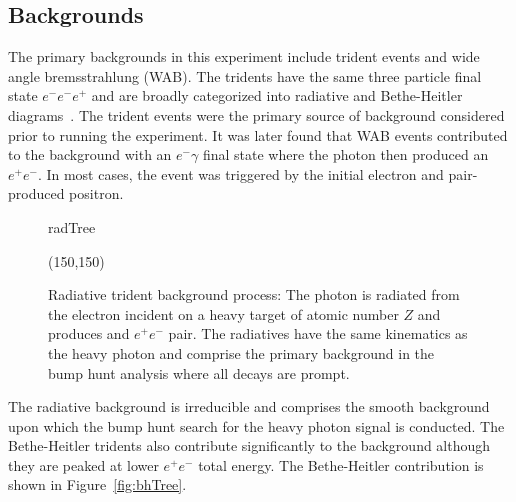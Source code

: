 \subsection{Backgrounds}

The primary backgrounds in this experiment include trident events and wide angle bremsstrahlung (WAB). The tridents have the same three particle final state $e^-e^-e^+$ and are broadly categorized into radiative and Bethe-Heitler diagrams~\cite{bjorken_new_2009}. The trident events were the primary source of background considered prior to running the experiment. It was later found that WAB events contributed to the background with an $e^-\gamma$ final state where the photon then produced an $e^+e^-$. In most cases, the event was triggered by the initial electron and pair-produced positron. 

\begin{figure}[htb]
    \begin{center}
	\begin{fmffile}{radTree}
	\begin{fmfgraph*}(150,150)
	\fmfstraight
		\fmffreeze
		\fmffreeze	
	\end{fmfgraph*}
	\end{fmffile}
  	\end{center}
    	\caption[Radiative background]{Radiative trident background process: The photon is radiated from the electron incident on a heavy target of atomic number $Z$ and produces and $e^+e^-$ pair. The radiatives have the same kinematics as the heavy photon and comprise the primary background in the bump hunt analysis where all decays are prompt. }
   	 \label{fig:radTree}	
\end{figure}

The radiative background is irreducible and comprises the smooth background upon which the bump hunt search for the heavy photon signal is conducted. The Bethe-Heitler tridents also contribute significantly to the background although they are peaked at lower $e^+e^-$ total energy. The Bethe-Heitler contribution is shown in Figure~\ref{fig:bhTree}.

